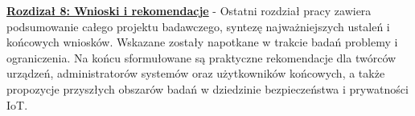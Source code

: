 \textbf{\hyperref[chap:rozdzial8] {Rozdizał 8: Wnioski i rekomendacje}} - Ostatni rozdział pracy zawiera podsumowanie całego projektu badawczego, syntezę najważniejszych ustaleń i końcowych wniosków. Wskazane zostały napotkane w trakcie badań problemy i ograniczenia. Na końcu sformułowane są praktyczne rekomendacje dla twórców urządzeń, administratorów systemów oraz użytkowników końcowych, a także propozycje przyszłych obszarów badań w dziedzinie bezpieczeństwa i prywatności IoT.



